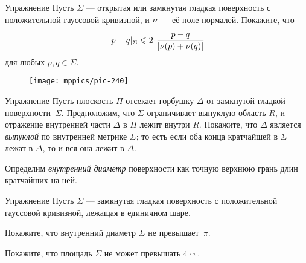 \begin{thm}{Упражнение}\label{ex:length-dist-conv}
Пусть $\Sigma$ --- открытая или замкнутая гладкая поверхность с положительной гауссовой кривизной, и $\nu$ --- её поле нормалей.
Покажите, что 
\[\dist{p}{q}\Sigma\le 2\cdot \frac{|p-q|}{|\Norm(p)+\Norm(q)|}\]
для любых $p,q\in \Sigma$.
\end{thm}


\begin{wrapfigure}{r}{27 mm}
\vskip-14mm
\centering
\texttt{[image: mppics/pic-240]}
\end{wrapfigure}

\begin{thm}{Упражнение}\label{ex:hat-convex}
Пусть плоскость $\Pi$ отсекает горбушку $\Delta$ от замкнутой гладкой поверхности~$\Sigma$.
Предположим, что $\Sigma$ ограничивает выпуклую область $R$, и отражение внутренней части $\Delta$ в $\Pi$ лежит внутри $R$.
Покажите, что $\Delta$ является \emph{выпуклой} по внутренней метрике $\Sigma$;
то есть 
если оба конца кратчайшей в $\Sigma$ 
лежат в $\Delta$,
то и вся она лежит в $\Delta$.
\end{thm}

Определим \emph{внутренний диаметр} поверхности как точную верхнюю грань длин кратчайших на ней.

\begin{thm}{Упражнение}\label{ex:intrinsic-diameter}
Пусть $\Sigma$ --- замкнутая гладкая поверхность с положительной гауссовой кривизной, лежащая в единичном шаре.

\begin{subthm}{}
Покажите, что внутренний диаметр $\Sigma$ не превышает~$\pi$.
\end{subthm}

\begin{subthm}{}
Покажите, что площадь $\Sigma$ не может превышать $4\cdot \pi$.
\end{subthm}

\end{thm}
